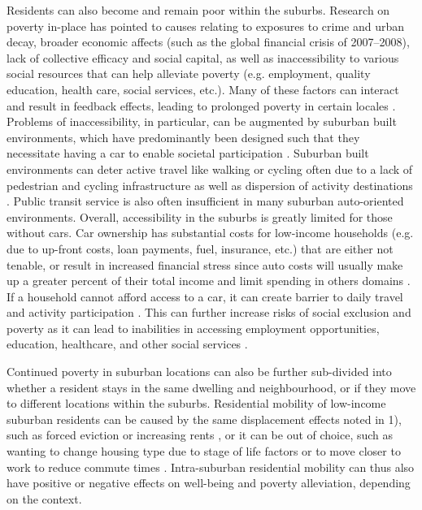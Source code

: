 Residents can also become and remain poor within the suburbs. Research on poverty in-place has pointed to causes relating to exposures to crime and urban decay, broader economic affects (such as the global financial crisis of 2007–2008), lack of collective efficacy and social capital, as well as inaccessibility to various social resources that can help alleviate poverty (e.g. employment, quality education, health care, social services, etc.). Many of these factors can interact and result in feedback effects, leading to prolonged poverty in certain locales \cite{wilson_truly_2012,sampson_great_2012}. Problems of inaccessibility, in particular, can be augmented by suburban built environments, which have predominantly been designed such that they necessitate having a car to enable societal participation \cite{urry_systemautomobility_2004,farber_my_2009,farber_running_2011}. Suburban built environments can deter active travel like walking or cycling often due to a lack of pedestrian and cycling infrastructure as well as dispersion of activity destinations \cite{ewing_travel_2010}. Public transit service is also often insufficient in many suburban auto-oriented environments. Overall, accessibility in the suburbs is greatly limited for those without cars. Car ownership has substantial costs for low-income households (e.g. due to up-front costs, loan payments, fuel, insurance, etc.) that are either not tenable, or result in increased financial stress since auto costs will usually make up a greater percent of their total income and limit spending in others domains \cite{klein_car_2017,walks_driving_2018, mattioli_vulnerability_2018}. If a household cannot afford access to a car, it can create barrier to daily travel and activity participation \cite{allen_planning_2020}. This can further increase risks of social exclusion and poverty as it can lead to inabilities in accessing employment opportunities, education, healthcare, and other social services \cite{lucas_transport_2012}. 

Continued poverty in suburban locations can also be further sub-divided into whether a resident stays in the same dwelling and neighbourhood, or if they move to different locations within the suburbs. Residential mobility of low-income suburban residents can be caused by the same displacement effects noted in 1), such as forced eviction or increasing rents \cite{august_gentrification_2018}, or it can be out of choice, such as wanting to change housing type due to stage of life factors or to move closer to work to reduce commute times \cite{morrow-jones_housing_2005}. Intra-suburban residential mobility can thus also have positive or negative effects on well-being and poverty alleviation, depending on the context.

